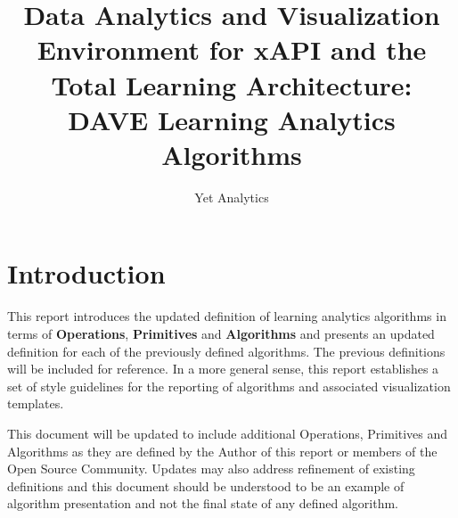 \documentclass{article}
\title{Data Analytics and Visualization Environment for xAPI and the Total Learning Architecture: DAVE Learning Analytics Algorithms}
\author{Yet Analytics}
\begin{document}
\begin{titlepage}
  \maketitle
\end{titlepage}

\section*{Introduction}

This report introduces the updated definition of learning analytics algorithms in terms of
\textbf{Operations}, \textbf{Primitives} and \textbf{Algorithms} and presents an updated definition for
each of the previously defined algorithms. The previous definitions will be included for reference.
In a more general sense, this report establishes a set of style guidelines for the reporting of algorithms and associated visualization templates.

This document will be updated to include additional Operations, Primitives and Algorithms
as they are defined by the Author of this report or members of the Open Source Community.
Updates may also address refinement of existing definitions and this document should be
understood to be an example of algorithm presentation and not the
final state of any defined algorithm.
\end{document}
